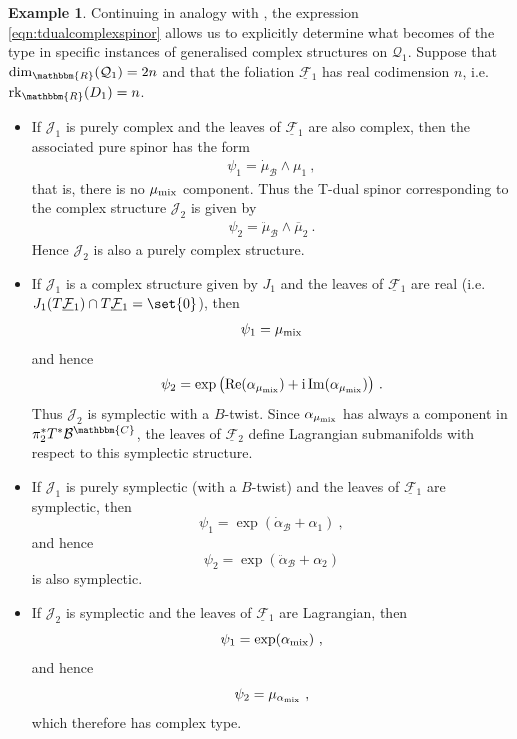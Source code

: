 \documentclass[a4paper, reqno, 11pt]{amsart}
\numberwithin{equation}{section}
\theoremstyle{definition}
\newtheorem{example}[equation]{Example}
\newcommand{\red}[1]{\underline{#1}}
\newcommand{\ii}{\mathrm{i}}
\newcommand{\IC}{\mathbbm{C}}
\newcommand{\IR}{\mathbbm{R}}
\newcommand{\cB}{{\mathcal B}}
\newcommand{\cQ}{{\mathcal Q}}
\newcommand{\cF}{{\mathcal F}}
\newcommand{\cJ}{{\mathcal J}}
\newcommand{\rk}{\mathrm{rk}}
\theoremstyle{remark}
\begin{document}
\begin{example}
Continuing in analogy with \cite{cavalcanti2011generalized}, the expression \eqref{eqn:tdualcomplexspinor} allows us to explicitly determine what becomes of the type in specific instances of generalised complex structures on $\cQ_1$. Suppose that $\dim_\IR (\cQ_1) = 2n$ and that the foliation $\red\cF{}_1$ has real codimension $n$, i.e. $\rk_\IR(D_1) =n$. 

\begin{itemize}
\item[$\Diamond$] If $\cJ_1$ is purely complex and the leaves of  $\red\cF{}_1$ are also complex, then the associated pure spinor has the form
\begin{align}
    \psi_{1} = \dot \mu_\cB \wedge \mu_1 \ ,
\end{align}
that is, there is no $\mu_{\rm mix}$ component. Thus the T-dual spinor corresponding to the complex structure $\cJ_2$ is given by
\begin{align}
    \psi_{2} = \ddot\mu_{\cB} \wedge \overline{\mu}_2 \ .
\end{align}
Hence $\cJ_2$ is also a purely complex structure. \\[-3mm]

\item[$\Diamond$] If $\cJ_1$ is a complex structure given by $J_1$ and the leaves of  $\red\cF{}_1$ are real (i.e. $J_1(T\red\cF{}_1) \cap T\red\cF{}_1 = \set{0}$), then 
\begin{align}
    \psi_{1} = \mu_{\rm mix}
    \end{align}
    and hence
    \begin{align}
    \psi_{2} = \exp\big({\rm Re}(\alpha_{\mu_{\rm mix}}) + \ii\, {\rm Im}(\alpha_{\mu_{\rm mix}})\big) \ .
\end{align}
Thus $\cJ_2$ is symplectic with a $B$-twist. Since $\alpha_{\mu_{\rm mix}}$ has always a component in $\pi_2^*T^*\cB^\IC$, the leaves of  $\red\cF{}_2$ define Lagrangian submanifolds with respect to this symplectic structure. \\[-3mm]

\item[$\Diamond$] If $\cJ_1$ is purely symplectic (with a $B$-twist) and the leaves of $\red\cF{}_1$ are symplectic, then $$\psi_{1} = \exp(\dot\alpha_\cB+\alpha_1) \ , $$ and hence $$\psi_{2} = \exp(\ddot \alpha_\cB+\alpha_2)$$ is also symplectic. \\[-3mm]

\item[$\Diamond$] If $\cJ_2$ is symplectic and the leaves of $\red\cF{}_1$ are Lagrangian, then $$\psi_{1} = \exp(\alpha_{\rm mix}) \ , $$ and hence $$\psi_{2} = \mu_{\alpha_{\rm mix}} \ , $$ which therefore has complex type.
\end{itemize}


\end{example}
\end{document}
